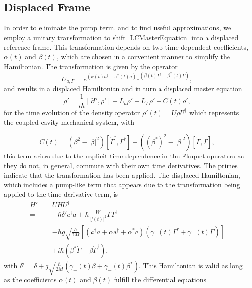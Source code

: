 \documentclass[reprint, amsmath,amssymb, aps,pra]{revtex4-1}
\begin{document}
\subsection{Displaced Frame}

In order to eliminate the pump term, and to find useful approximations,
we employ a unitary transformation to shift \eqref{LCMasterEquation}
into a displaced reference frame. This transformation depends on two
time-dependent coefficients, $\alpha(t)$ and $\beta(t)$, which are
chosen in a convenient manner to simplify the Hamiltonian. The
transformation is given by the operator
\begin{equation}\label{ShiftTransform}
U_{a,\Gamma} = e^{(\alpha(t) a^\dagger - \alpha^*(t)a)}e^{(\beta(t) \Gamma^\dagger - \beta^*(t)\Gamma)},
\end{equation}
and results in a displaced Hamiltonian and in turn a displaced master
equation
\begin{equation}\label{eq:master_no_small}
\dot{\rho}' = \frac{1}{i\hbar}[H',\rho'] +L_a\rho' + L_\Gamma \rho' + C(t)\rho' ,
\end{equation} for the time evolution of the density operator
$\rho'(t)=U\rho U^\dagger$ which represents the coupled
cavity-mechanical system,  with 

\begin{equation}
C(t)=(\beta^2-|\beta|^2)[\dot{\Gamma}^\dagger,\Gamma^\dagger]-((\beta^*)^2-|\beta|^2)[\dot{\Gamma},\Gamma],
\end{equation}
this term arises due to the explicit time dependence in the Floquet
operators as they do not, in general, commute with their own time
derivatives. The primes indicate that the transformation has been
applied. The displaced Hamiltonian, which includes a pump-like term
that appears due to the transformation being applied to the time
derivative term, is
\begin{align}\label{eq:hamiltonian_no_small}
  H'=&U H U^\dagger\nonumber\\=& -\hbar \delta' a^\dagger a + \hbar\frac{W}{|f(t)|^2}\Gamma \Gamma^\dagger\nonumber\\
     &-\hbar g\sqrt{\frac{\hbar}{2M}}[(a^{\dagger}a +\alpha a^{\dagger}+\alpha^* a)(\gamma_-(t)\Gamma^{\dagger}+\gamma_+(t)\Gamma)]\nonumber\\
     &+ i\hbar(\beta^*\dot{\Gamma} - \beta \dot{\Gamma}^\dagger),
\end{align}
with $\delta' = \delta + g\sqrt{\frac{\hbar}{2M}}(\gamma_+(t)\beta + \gamma_-(t)\beta^*)$.
This Hamiltonian is valid as long as the coefficients $\alpha(t)$ and
$\beta(t)$ fulfill the differential equations
\end{document}
